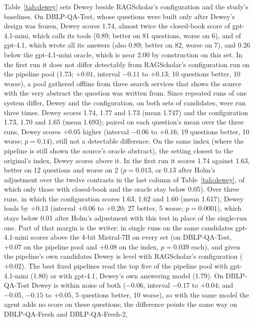 \documentclass[conference]{IEEEtran}
\newcommand{\fresh}{DBLP-QA-Fresh}
\newcommand{\freshb}{DBLP-QA-Fresh-2}
\newcommand{\test}{DBLP-QA-Test}
\begin{document}
Table~\ref{tab:dewey} sets Dewey beside RAGScholar's configuration and the study's baselines. On
\test{}, whose questions were built only after Dewey's design was frozen, Dewey scores 1.74, almost
twice the closed-book score of gpt-4.1-mini, which calls its tools (0.89; better on 81 questions, worse on
6), and of gpt-4.1, which wrote all its answers (also 0.89; better on 82, worse on 7), and 0.26 below
the gpt-4.1-mini oracle, which is near 2.00 by construction on this set. In the first run it does not
differ detectably from RAGScholar's configuration run on the pipeline pool (1.73; $+0.01$, interval
$-0.11$ to $+0.13$; 10 questions better, 10 worse), a pool gathered offline from three search services
that shows the source with the very abstract the question was written from. Since repeated runs of
one system differ, Dewey and the configuration, on both sets of candidates, were run three times. Dewey scores 1.74, 1.77 and 1.73 (mean
1.747) and the configuration 1.73, 1.70 and 1.65 (mean 1.693); paired on each question's mean over the
three runs, Dewey scores $+0.05$ higher (interval $-0.06$ to $+0.16$; 19 questions better, 10 worse;
$p=0.14$), still not a detectable difference. On the same index (where the pipeline is still shown the
source's oracle abstract), the setting closest to the original's index, Dewey scores above it. In the
first run it scores 1.74 against 1.63, better on 12 questions and worse on 2 ($p=0.013$, or $0.13$ after
Holm's adjustment over the twelve contrasts in the last column of Table~\ref{tab:dewey}, of which only
those with closed-book and the oracle stay below 0.05). Over three runs, in which the configuration scores
1.63, 1.62 and 1.60 (mean 1.617), Dewey leads by $+0.13$ (interval $+0.06$ to $+0.20$; 27 better, 5 worse;
$p=0.0001$), which stays below 0.01 after Holm's adjustment with this test in place of the single-run one.
Part of that margin is the writer: in single runs on the same candidates gpt-4.1-mini scores above the 4-bit
Mistral-7B on every set (on \test{}, $+0.07$ on the pipeline pool and $+0.08$ on the index, $p=0.039$
each), and given the pipeline's own candidates Dewey is level with RAGScholar's configuration ($+0.02$). The best fixed pipelines
read the top five of the pipeline pool with gpt-4.1-mini (1.80) or with gpt-4.1, Dewey's own answering
model (1.79). On \test{} Dewey is within noise of both ($-0.06$, interval $-0.17$ to $+0.04$; and $-0.05$,
$-0.15$ to $+0.05$, 5 questions better, 10 worse), so with the same model the agent adds no score on these
questions; the difference points the same way on \fresh{} and \freshb{},
\end{document}
